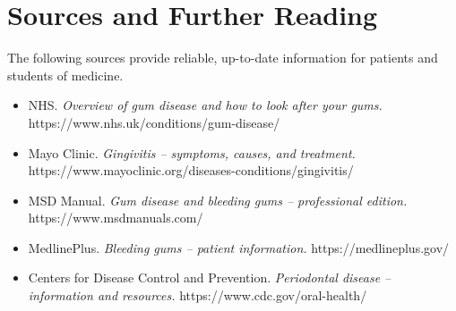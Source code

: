 \section*{Sources and Further Reading}
The following sources provide reliable, up-to-date information for patients and students of medicine.

\begin{itemize}
    \item NHS. \textit{Overview of gum disease and how to look after your gums.} https://www.nhs.uk/conditions/gum-disease/
    \item Mayo Clinic. \textit{Gingivitis -- symptoms, causes, and treatment.} https://www.mayoclinic.org/diseases-conditions/gingivitis/
    \item MSD Manual. \textit{Gum disease and bleeding gums -- professional edition.} https://www.msdmanuals.com/
    \item MedlinePlus. \textit{Bleeding gums -- patient information.} https://medlineplus.gov/
    \item Centers for Disease Control and Prevention. \textit{Periodontal disease -- information and resources.} https://www.cdc.gov/oral-health/
\end{itemize}
